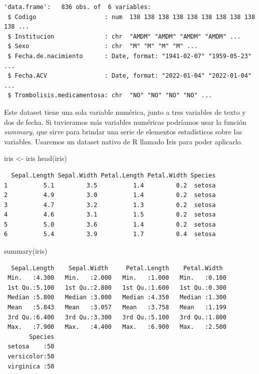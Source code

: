 \documentclass[
  letterpaper,
  DIV=11,
  numbers=noendperiod]{scrreprt}
\newenvironment{Shaded}{\begin{snugshade}}{\end{snugshade}}
\newcommand{\FunctionTok}[1]{\textcolor[rgb]{0.28,0.35,0.67}{#1}}
\newcommand{\NormalTok}[1]{\textcolor[rgb]{0.00,0.23,0.31}{#1}}
\newcommand{\OtherTok}[1]{\textcolor[rgb]{0.00,0.23,0.31}{#1}}
\begin{document}
\begin{verbatim}
'data.frame':   836 obs. of  6 variables:
 $ Codigo                   : num  138 138 138 138 138 138 138 138 138 138 ...
 $ Institucion              : chr  "AMDM" "AMDM" "AMDM" "AMDM" ...
 $ Sexo                     : chr  "M" "M" "M" "M" ...
 $ Fecha.de.nacimiento      : Date, format: "1941-02-07" "1959-05-23" ...
 $ Fecha.ACV                : Date, format: "2022-01-04" "2022-01-04" ...
 $ Trombolisis.medicamentosa: chr  "NO" "NO" "NO" "NO" ...
\end{verbatim}

Este dataset tiene una sola variable numérica, junto a tres variables de
texto y dos de fecha. Si tuvieramos más variables numéricas podríamos
usar la función \emph{summary,} que sirve para brindar una serie de
elementos estadísticos sobre las variables. Usaremos un dataset nativo
de R llamado Iris para poder aplicarlo.

\begin{Shaded}
\begin{Highlighting}[]
\NormalTok{iris }\OtherTok{\textless{}{-}}\NormalTok{ iris}
\FunctionTok{head}\NormalTok{(iris)}
\end{Highlighting}
\end{Shaded}

\begin{verbatim}
  Sepal.Length Sepal.Width Petal.Length Petal.Width Species
1          5.1         3.5          1.4         0.2  setosa
2          4.9         3.0          1.4         0.2  setosa
3          4.7         3.2          1.3         0.2  setosa
4          4.6         3.1          1.5         0.2  setosa
5          5.0         3.6          1.4         0.2  setosa
6          5.4         3.9          1.7         0.4  setosa
\end{verbatim}

\begin{Shaded}
\begin{Highlighting}[]
\FunctionTok{summary}\NormalTok{(iris)}
\end{Highlighting}
\end{Shaded}

\begin{verbatim}
  Sepal.Length    Sepal.Width     Petal.Length    Petal.Width   
 Min.   :4.300   Min.   :2.000   Min.   :1.000   Min.   :0.100  
 1st Qu.:5.100   1st Qu.:2.800   1st Qu.:1.600   1st Qu.:0.300  
 Median :5.800   Median :3.000   Median :4.350   Median :1.300  
 Mean   :5.843   Mean   :3.057   Mean   :3.758   Mean   :1.199  
 3rd Qu.:6.400   3rd Qu.:3.300   3rd Qu.:5.100   3rd Qu.:1.800  
 Max.   :7.900   Max.   :4.400   Max.   :6.900   Max.   :2.500  
       Species  
 setosa    :50  
 versicolor:50  
 virginica :50  
                
                
                
\end{verbatim}
\end{document}

